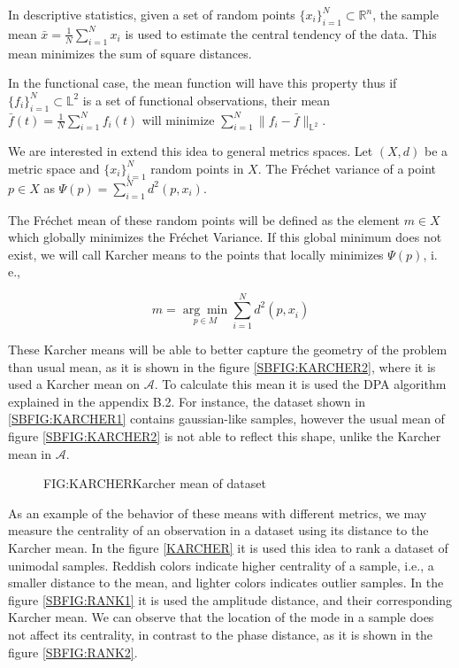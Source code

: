 In descriptive statistics, given a set of random points
$\{x_i\}_{i=1}^{N} \subset \mathbb{R}^n$, the sample mean
$\bar x = \frac{1}{N}\sum_{i=1}^{N} x_i$ is used to estimate the central
tendency of the data. This mean minimizes the sum of square distances.

In the functional case, the mean function will have this property thus if
$\{f_i\}_{i=1}^{N} \subset \mathbb{L}^2$ is a set of functional observations,
their mean $\bar f(t) = \frac{1}{N}\sum_{i=1}^{N} f_i(t)$ will minimize
$\sum_{i=1}^{N}\|f_i - \bar f\|_{\mathbb{L}^2}$.

We are interested in extend this idea to general metrics spaces.
Let $(X, d)$ be a metric space and $\{x_i\}_{i=1}^{N}$ random points in $X$.
The Fréchet variance of a point $p \in X$ as $\Psi(p)=\sum_{i=1}^{N} d^{2}\left(p, x_{i}\right)$.

The Fréchet mean of these random points will be defined as the element $m \in X$
which globally minimizes the Fréchet Variance. If this global minimum does not
exist, we will call Karcher means to the points that locally minimizes
$\Psi(p)$, i. e.,

$$
m=\underset{p \in M}{\arg \min } \sum_{i=1}^{N} d^{2}\left(p, x_{\dot{i}}\right)
$$

These Karcher means will be able to better capture the geometry of the problem
than usual mean, as it is shown in the figure \ref{SBFIG:KARCHER2}, where it is
used a Karcher mean on $\mathscr{A}$.
To calculate this mean it is used the DPA algorithm explained in the appendix B.2.
For instance, the dataset shown in \ref{SBFIG:KARCHER1} contains gaussian-like
samples, however the usual mean of figure \ref{SBFIG:KARCHER2} is not able to reflect
this shape, unlike the Karcher mean in $\mathscr{A}$.

\begin{figure}[Karcher mean of dataset]{FIG:KARCHER}{Karcher mean of dataset}
   \quad
   \\
   \quad
\end{figure}

As an example of the behavior of these means with different metrics, we may
measure the centrality of an observation in a dataset using its distance to the
Karcher mean. In the figure \ref{KARCHER} it is used this idea to rank a dataset of
unimodal samples. Reddish colors indicate higher centrality of a sample, i.e.,
a smaller distance to the mean, and lighter colors indicates outlier samples.
In the figure \ref{SBFIG:RANK1} it is used the amplitude distance, and their
corresponding Karcher mean. We can observe that the location of the mode in a
sample does not affect its centrality, in contrast to the phase distance,
as it is shown in the figure \ref{SBFIG:RANK2}.
